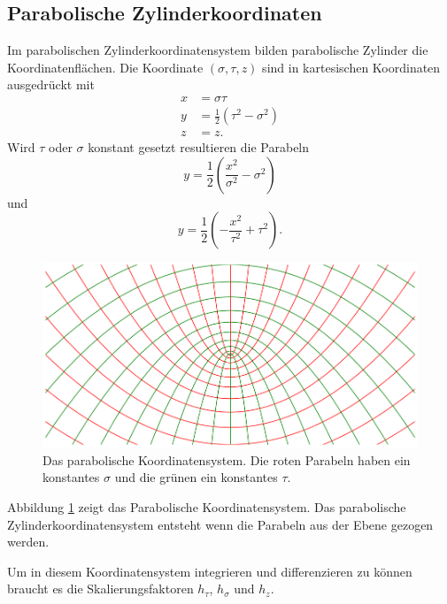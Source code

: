 \subsection{Parabolische Zylinderkoordinaten
\label{parzyl:subsection:finibus}}
Im parabolischen Zylinderkoordinatensystem bilden parabolische Zylinder die Koordinatenflächen.
Die Koordinate $(\sigma, \tau, z)$ sind in kartesischen Koordinaten ausgedrückt mit
\begin{align}
    x & = \sigma \tau \\
    \label{parzyl:coordRelationsa}
    y & = \frac{1}{2}\left(\tau^2 - \sigma^2\right) \\
    z & = z.
    \label{parzyl:coordRelationse}
\end{align}
Wird $\tau$ oder $\sigma$ konstant gesetzt resultieren die Parabeln
\begin{equation}
    y = \frac{1}{2} \left( \frac{x^2}{\sigma^2} - \sigma^2 \right)
\end{equation}
und 
\begin{equation}
    y = \frac{1}{2} \left( -\frac{x^2}{\tau^2} + \tau^2 \right).
\end{equation}

\begin{figure}
    \centering
    \includegraphics[scale=0.4]{papers/parzyl/img/koordinaten.png}
    \caption{Das parabolische Koordinatensystem. Die roten Parabeln haben ein 
    konstantes $\sigma$ und die grünen ein konstantes $\tau$.}
    \label{parzyl:fig:cordinates}
\end{figure}

Abbildung \ref{parzyl:fig:cordinates} zeigt das Parabolische Koordinatensystem.
Das parabolische Zylinderkoordinatensystem entsteht wenn die Parabeln aus der
Ebene gezogen werden. 

Um in diesem Koordinatensystem integrieren und differenzieren zu 
können braucht es die Skalierungsfaktoren $h_{\tau}$, $h_{\sigma}$ und $h_{z}$.

